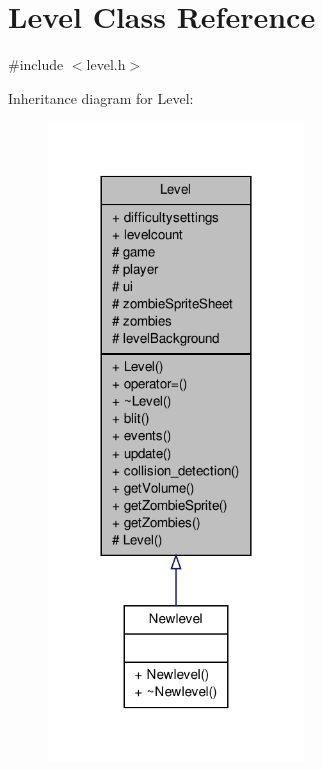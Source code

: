 \hypertarget{classLevel}{\section{Level Class Reference}
\label{classLevel}
}


{\ttfamily \#include $<$level.\-h$>$}



Inheritance diagram for Level\-:\nopagebreak
\begin{figure}[H]
\begin{center}
\leavevmode
\includegraphics[width=192pt]{classLevel__inherit__graph}
\end{center}
\end{figure}


